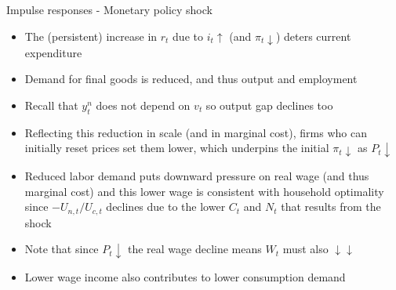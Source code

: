 \documentclass{beamer}
\begin{document}

	
\begin{frame}{Impulse responses - Monetary policy shock}

\begin{itemize}
\item	The (persistent) increase in $r_{t}$ due to $i_{t} \uparrow$ (and $\pi_{t} \downarrow$) deters current expenditure
\item	Demand for final goods is reduced, and thus output and employment
\item	Recall that $y^{n}_{t}$ does not depend on $v_{t}$ so output gap declines too
\item	Reflecting this reduction in scale (and in marginal cost), firms who can initially reset prices set them lower, which underpins the initial $\pi_{t}\downarrow$ as $P_{t}\downarrow$
\item	Reduced labor demand puts downward pressure on real wage (and thus marginal cost) and this lower wage is consistent with household optimality since $-U_{n,t}/U_{c,t}$ declines due to the lower $C_{t}$ and $N_{t}$ that results from the shock
\item	Note that since $P_{t}\downarrow$ the real wage decline means $W_{t}$ must also $\downarrow \downarrow$
\item	Lower wage income also contributes to lower consumption demand
\end{itemize}

\end{frame}
\end{document}
